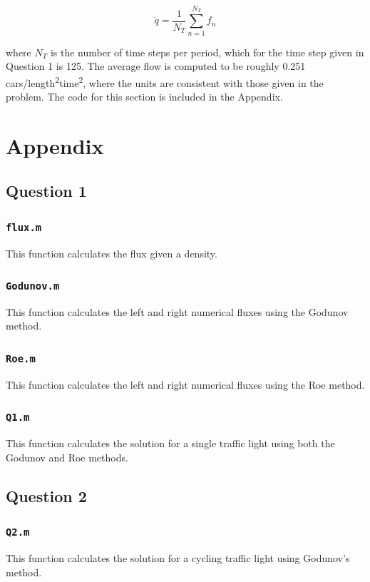 \documentclass[10pt]{article}
\newcommand{\beq}{\begin{equation}}
\newcommand{\eeq}{\end{equation}}
\begin{document}
\beq
\dot{q}=\frac{1}{N_T}\sum_{n=1}^{N_T}f_n
\eeq

where \(N_T\) is the number of time steps per period, which for the time step given in Question 1 is 125. The average flow is computed to be roughly 0.251 cars/length\textsuperscript{2}time\textsuperscript{2}, where the units are consistent with those given in the problem. The code for this section is included in the Appendix.




\section{Appendix}
\subsection{Question 1}
\subsubsection{{\tt flux.m}}
This function calculates the flux given a density.

\subsubsection{{\tt Godunov.m}}
This function calculates the left and right numerical fluxes using the Godunov method.

\subsubsection{{\tt Roe.m}}
This function calculates the left and right numerical fluxes using the Roe method.

\subsubsection{{\tt Q1.m}}
This function calculates the solution for a single traffic light using both the Godunov and Roe methods.


\subsection{Question 2}
\subsubsection{{\tt Q2.m}}
This function calculates the solution for a cycling traffic light using Godunov's method.

\end{document}
